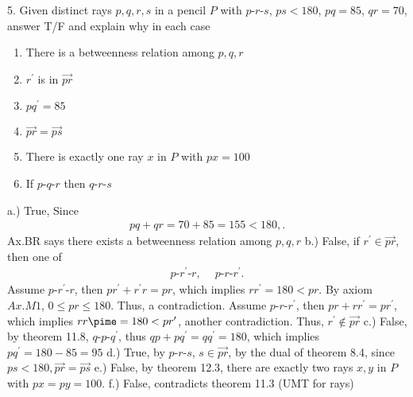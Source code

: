 \documentclass{report}
\begin{document}
    \pagebreak \bigbreak \noindent 
    \begin{mdframed}
        5. Given distinct rays $p,q,r,s$ in a pencil $P$ with $ p\text{-}r\text{-}s$, $ps < 180$, $pq=85$, $qr = 70 $, answer T/F and explain why in each case
        \begin{enumerate}[label=(\alph*)]
            \item There is a betweenness relation among $p,q,r$
            \item $r^{\prime}$ is in $\overrightarrow{pr}$
            \item $pq^{\prime}  = 85$
            \item $\overrightarrow{pr} = \overrightarrow{ps} $
            \item There is exactly one ray $x$ in $P$ with $px = 100 $
            \item If $ p\text{-}q\text{-}r$ then $ q\text{-}r\text{-}s$
        \end{enumerate}
    \end{mdframed}
    \bigbreak \noindent 
    a.) True, Since
    \begin{align*}
        pq + qr = 70 + 85 = 155 < 180,
    .\end{align*}
    Ax.BR says there exists a betweenness relation among $p,q,r$
    \bigbreak \noindent 
    b.) False, if $r^{\prime} \in \overrightarrow{pr}$, then one of 
    \begin{align*}
        p\text{-}r^{\prime}\text{-}r,\ \quad p\text{-}r\text{-}r^{\prime}
    .\end{align*}
    Assume $ p\text{-}r^{\prime}\text{-}r $, then $pr^{\prime} + r^{\prime}r = pr$, which implies $rr^{\prime} =180 < pr$. By axiom $Ax.M1$, $ 0 \leq pr \leq 180 $. Thus, a contradiction.
    \bigbreak \noindent 
    Assume $ p\text{-}r\text{-}r^{\prime}$, then $ pr + rr^{\prime} = pr^{\prime}$, which implies $rr\pime = 180 < pr^{\prime}$, another contradiction. 
    \bigbreak \noindent 
    Thus, $r^{\prime} \not \in \overrightarrow{pr} $
    \bigbreak \noindent 
    c.) False, by theorem 11.8, $ q\text{-}p\text{-}q^{\prime}$, thus $ qp + pq^{\prime} = qq^{\prime} = 180$, which implies $pq^{\prime} = 180 - 85 = 95 $
    \bigbreak \noindent 
    d.) True, by $ p\text{-}r\text{-}s$, $s \in \overrightarrow{pr}$, by the dual of theorem 8.4, since $ ps < 180, \overrightarrow{pr} = \overrightarrow{ps} $
    \bigbreak \noindent 
    e.) False, by theorem 12.3, there are exactly two rays $x,y$ in $P$ with $px = py = 100$.
    \bigbreak \noindent 
    f.) False, contradicts theorem 11.3 (UMT for rays)
\end{document}
